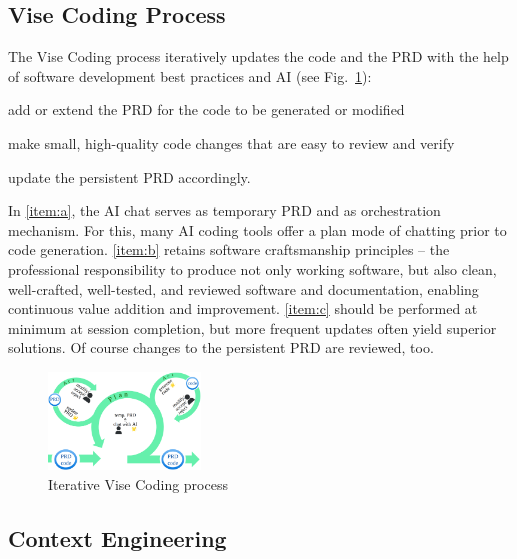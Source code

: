 \documentclass[twocolumn]{article}
\begin{document}
\subsection{Vise Coding Process}

The Vise Coding process iteratively updates the code and the PRD with the help of software development best practices and AI (see Fig.~\ref{fig:process}):
\begin{compactenum}[(a)]
\item add or extend the PRD for the code to be generated or modified\label{item:a} 
\item make small, high-quality code changes that are easy to review and verify\label{item:b}
\item update the persistent PRD accordingly.\label{item:c}
\end{compactenum}

In \ref{item:a}, the AI chat serves as temporary PRD and as orchestration mechanism.
For this, many AI coding tools offer a plan mode of chatting prior to code generation. 
\ref{item:b} retains software craftsmanship principles -- the professional responsibility to produce not only working software,
but also clean, well-crafted, well-tested, and reviewed software and documentation,
enabling continuous value addition and improvement.
\ref{item:c} should be performed at minimum at session completion,
but more frequent updates often yield superior solutions.
Of course changes to the persistent PRD are reviewed, too.

\begin{figure}[hbt!]
  \begin{center}
  \vspace{-4mm}
  \includegraphics[width=0.36\textwidth]{figures/vise_process_v2}
  \vspace{-4mm}
\caption{Iterative Vise Coding process}
\label{fig:process}
\end{center}
\end{figure}

\subsection{Context Engineering}
\end{document}
